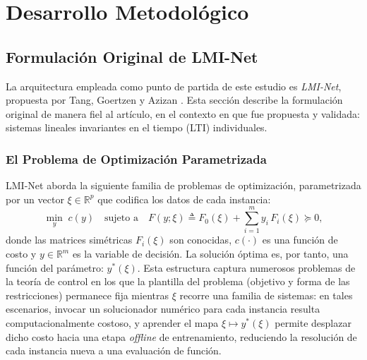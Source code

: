 \chapter{Desarrollo Metodológico}
\label{ch:desarrollo}


\section{Formulación Original de LMI-Net}
\label{sec:arquitectura_lminet}

La arquitectura empleada como punto de partida de este estudio es \textit{LMI-Net}, 
propuesta por Tang, Goertzen y Azizan \cite{tang2026lminet}. Esta sección describe la 
formulación original de manera fiel al artículo, en el contexto en que fue propuesta y 
validada: sistemas lineales invariantes en el tiempo (LTI) individuales. 


\subsection{El Problema de Optimización Parametrizada}
\label{subsec:problema_parametrizado}

LMI-Net aborda la siguiente familia de problemas de optimización, parametrizada por un 
vector $\xi \in \mathbb{R}^p$ que codifica los datos de cada instancia:
\begin{equation}
    \min_{y}\; c(y) \quad \text{sujeto a} \quad 
    F(y;\xi) \triangleq F_0(\xi) + \sum_{i=1}^{m} y_i\, F_i(\xi) \succeq 0,
    \label{eq:problema_parametrizado}
\end{equation}
donde las matrices simétricas $F_i(\xi)$ son conocidas, $c(\cdot)$ es una función de 
costo y $y \in \mathbb{R}^m$ es la variable de decisión. La solución óptima es, por 
tanto, una función del parámetro: $y^*(\xi)$. Esta estructura captura numerosos 
problemas de la teoría de control en los que la plantilla del problema (objetivo y 
forma de las restricciones) permanece fija mientras $\xi$ recorre una familia de 
sistemas: en tales escenarios, invocar un solucionador numérico para cada instancia 
resulta computacionalmente costoso, y aprender el mapa $\xi \mapsto y^*(\xi)$ permite 
desplazar dicho costo hacia una etapa \textit{offline} de entrenamiento, reduciendo la 
resolución de cada instancia nueva a una evaluación de función.


